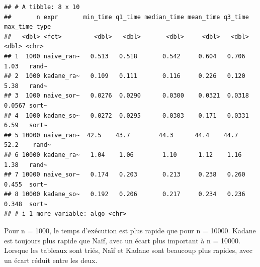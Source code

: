 \documentclass[
]{article}
\begin{document}
\begin{verbatim}
## # A tibble: 8 x 10
##       n expr       min_time q1_time median_time mean_time q3_time max_time type 
##   <dbl> <fct>         <dbl>   <dbl>       <dbl>     <dbl>   <dbl>    <dbl> <chr>
## 1  1000 naive_ran~   0.513   0.518       0.542     0.604   0.706    1.03   rand~
## 2  1000 kadane_ra~   0.109   0.111       0.116     0.226   0.120    5.38   rand~
## 3  1000 naive_sor~   0.0276  0.0290      0.0300    0.0321  0.0318   0.0567 sort~
## 4  1000 kadane_so~   0.0272  0.0295      0.0303    0.171   0.0331   6.59   sort~
## 5 10000 naive_ran~  42.5    43.7        44.3      44.4    44.7     52.2    rand~
## 6 10000 kadane_ra~   1.04    1.06        1.10      1.12    1.16     1.38   rand~
## 7 10000 naive_sor~   0.174   0.203       0.213     0.238   0.260    0.455  sort~
## 8 10000 kadane_so~   0.192   0.206       0.217     0.234   0.236    0.348  sort~
## # i 1 more variable: algo <chr>
\end{verbatim}

Pour n = 1000, le temps d'exécution est plus rapide que pour n = 10000.
Kadane est toujours plus rapide que Naïf, avec un écart plus important à
n = 10000. Lorsque les tableaux sont triés, Naïf et Kadane sont beaucoup
plus rapides, avec un écart réduit entre les deux.
\end{document}

